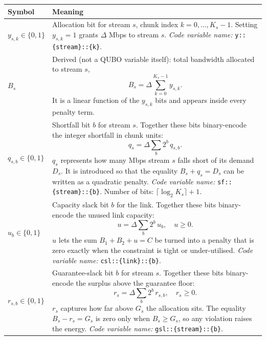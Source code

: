 \documentclass[11pt,a4paper]{article}
\begin{document}
\begin{tabular}{@{}lp{10.5cm}@{}}
\toprule
Symbol & Meaning \\
\midrule
$y_{s,k}\in\{0,1\}$ & Allocation bit for stream $s$, chunk index $k=0,\dots,K_s-1$.
                       Setting $y_{s,k}=1$ grants $\Delta$ Mbps to stream $s$.
                       \textit{Code variable name:} \texttt{y::\{stream\}::\{k\}}. \\[4pt]

$B_s$ & Derived (not a QUBO variable itself): total bandwidth allocated to
        stream $s$,
        \[B_s = \Delta\sum_{k=0}^{K_s-1} y_{s,k}.\]
        It is a linear function of the $y_{s,k}$ bits and appears inside every
        penalty term. \\[4pt]

$q_{s,b}\in\{0,1\}$ & Shortfall bit $b$ for stream $s$.
                       Together these bits binary-encode the integer shortfall
                       in chunk units:
                       \[q_s = \Delta\sum_{b} 2^b\, q_{s,b}.\]
                       $q_s$ represents how many Mbps stream $s$ falls short of
                       its demand $D_s$.  It is introduced so that the equality
                       $B_s + q_s = D_s$ can be written as a quadratic penalty.
                       \textit{Code variable name:} \texttt{sf::\{stream\}::\{b\}}.
                       Number of bits: $\lceil\log_2 K_s\rceil + 1$.\\[4pt]

$u_b\in\{0,1\}$ & Capacity slack bit $b$ for the link.
                  Together these bits binary-encode the unused link capacity:
                  \[u = \Delta\sum_{b} 2^b\, u_b,\quad u \ge 0.\]
                  $u$ lets the sum $B_1+B_2+u=C$ be turned into a
                  penalty that is zero exactly when the constraint is tight or
                  under-utilised.
                  \textit{Code variable name:} \texttt{csl::\{link\}::\{b\}}.\\[4pt]

$r_{s,b}\in\{0,1\}$ & Guarantee-slack bit $b$ for stream $s$.
                       Together these bits binary-encode the surplus above the
                       guarantee floor:
                       \[r_s = \Delta\sum_{b} 2^b\, r_{s,b},\quad r_s \ge 0.\]
                       $r_s$ captures how far above $G_s$ the allocation sits.
                       The equality $B_s - r_s = G_s$ is zero only when
                       $B_s \ge G_s$, so any violation raises the energy.
                       \textit{Code variable name:} \texttt{gsl::\{stream\}::\{b\}}.\\

\bottomrule
\end{tabular}
\end{document}
